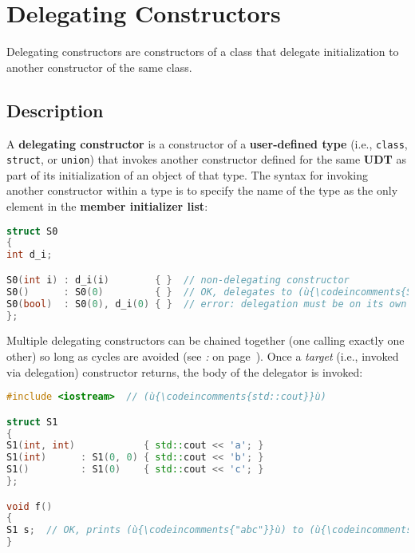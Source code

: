\newpage
\section[Delegating Constructors]{Delegating Constructors}\label{delegating-constructors}


Delegating constructors are constructors of a class that delegate initialization to another
constructor of the same class.

\subsection[Description]{Description}\label{description}

A \textbf{delegating constructor} is a constructor of a
\textbf{user-defined type} (i.e., \texttt{class}, \texttt{struct}, or
\texttt{union}) that invokes another constructor defined for the same
\textbf{UDT} as part of its initialization of an object of that type.
The syntax for invoking another constructor within a type is to specify
the name of the type as the only element in the \textbf{member
initializer list}:

\begin{lstlisting}[language=C++]
struct S0
{
int d_i;

S0(int i) : d_i(i)        { }  // non-delegating constructor
S0()      : S0(0)         { }  // OK, delegates to (ù{\codeincomments{S0(int)}}ù)
S0(bool)  : S0(0), d_i(0) { }  // error: delegation must be on its own
};
\end{lstlisting}

\noindent Multiple delegating constructors can be chained together (one calling
exactly one other) so long as cycles are avoided (see
{\it{}:} {\it{}} on page~\pageref{delegation-cycles}). Once a \emph{target} (i.e., invoked via delegation) constructor returns,
the body of the delegator is invoked:

\begin{lstlisting}[language=C++]
#include <iostream>  // (ù{\codeincomments{std::cout}}ù)

struct S1
{
S1(int, int)            { std::cout << 'a'; }
S1(int)      : S1(0, 0) { std::cout << 'b'; }
S1()         : S1(0)    { std::cout << 'c'; }
};

void f()
{
S1 s;  // OK, prints (ù{\codeincomments{"abc"}}ù) to (ù{\codeincomments{stdout}}ù)
}
\end{lstlisting}

